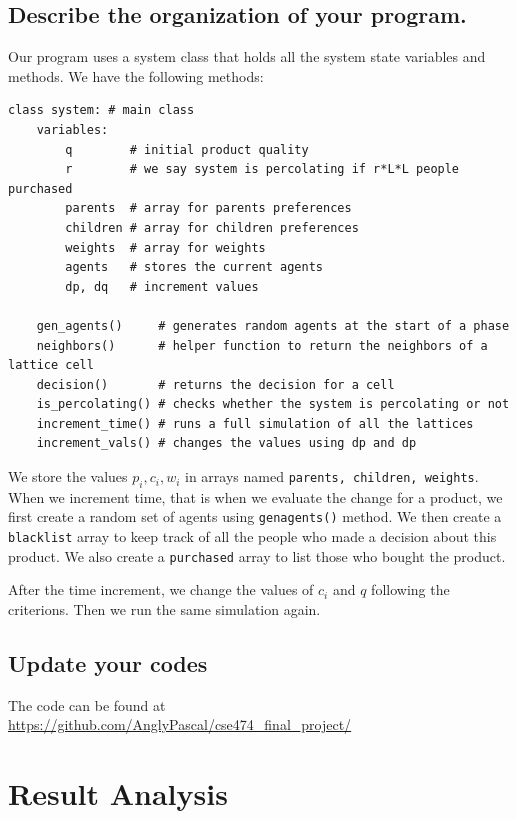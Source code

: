 \documentclass[article, 11pt, a4paper, onesize]{memoir}
\begin{document}
\subsection{Describe the organization of your program.}

Our program uses a system class that holds all the system state variables and methods. We
have the following methods:

\begin{lstlisting}[style=mypy]
class system: # main class
    variables:
        q        # initial product quality
        r        # we say system is percolating if r*L*L people purchased
        parents  # array for parents preferences
        children # array for children preferences
        weights  # array for weights
        agents   # stores the current agents
        dp, dq   # increment values

    gen_agents()     # generates random agents at the start of a phase
    neighbors()      # helper function to return the neighbors of a lattice cell
    decision()       # returns the decision for a cell
    is_percolating() # checks whether the system is percolating or not
    increment_time() # runs a full simulation of all the lattices
    increment_vals() # changes the values using dp and dp
\end{lstlisting}

We store the values \(p_i, c_i, w_i\) in arrays named \texttt{parents, children, weights}.
When we increment time, that is when we evaluate the change for a product, we first create
a random set of agents using \texttt{gen\textunderscore agents()} method. We then create a
\texttt{blacklist} array to keep track of all the people who made a decision about this
product. We also create a \texttt{purchased} array to list those who bought the product. 

After the time increment, we change the values of \(c_i\) and \(q\) following the
criterions. Then we run the same simulation again.


\subsection{Update your codes}

The code can be found at \url{https://github.com/AnglyPascal/cse474_final_project/}

\section{Result Analysis}
\end{document}
